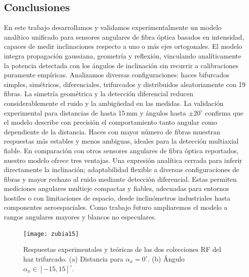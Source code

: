\documentclass[11pt,a4paper]{article}
\begin{document}
\begin{multicols}{2}
\section{Conclusiones}
En este trabajo desarrollamos y validamos experimentalmente un modelo analítico unificado para sensores angulares de fibra óptica basados en intensidad, capaces de medir inclinaciones respecto a uno o más ejes ortogonales. El modelo integra propagación gaussiana, geometría y reflexión, vinculando analíticamente la potencia detectada con los ángulos de inclinación sin recurrir a calibraciones puramente empíricas. Analizamos diversas configuraciones: haces bifurcados simples, simétricos, diferenciales, trifurcados y distribuidos aleatoriamente con 19 fibras. La simetría geométrica y la detección diferencial reducen considerablemente el ruido y la ambigüedad en las medidas. La validación experimental para distancias de hasta 15\,mm y ángulos hasta $\pm20^\circ$ confirma que el modelo describe con precisión el comportamiento tanto angular como dependiente de la distancia. Haces con mayor número de fibras muestran respuestas más estables y menos ambiguas, ideales para la detección multiaxial fiable. En comparación con otros sensores angulares de fibra óptica reportados, nuestro modelo ofrece tres ventajas. Una expresión analítica cerrada para inferir directamente la inclinación; adaptabilidad flexible a diversas configuraciones de fibras y mayor rechazo al ruido mediante detección diferencial. Estas permiten mediciones angulares multieje compactas y fiables, adecuadas para entornos hostiles o con limitaciones de espacio, desde inclinómetros industriales hasta componentes aeroespaciales. Como trabajo futuro ampliaremos el modelo a rangos angulares mayores y blancos no especulares.
\begin{figure}[H]
    \centering
    \texttt{[image: zubia15]}
    \caption{Respuestas experimentales y teóricas de las dos colecciones RF del haz trifurcado. (a) Distancia para $\alpha_x=0^\circ$. (b) Ángulo $\alpha_x \in [-15,15]^\circ$.}
    \label{fig:5_15}
\end{figure}
\unskip
\end{multicols}
\end{document}
